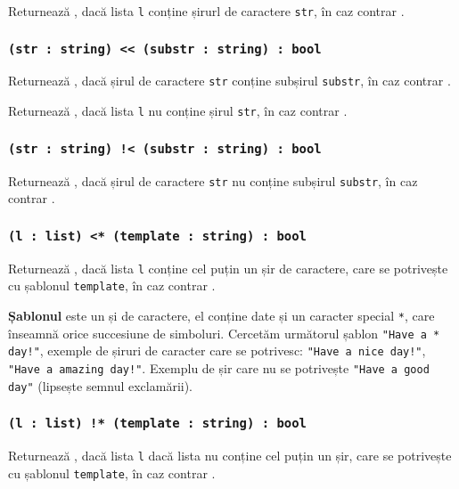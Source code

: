 Returnează \true{}, dacă lista \texttt{l} conține șirurl de caractere \texttt{str}, în caz contrar \false{}.

\subsubsection{\texttt{(str : string) << (substr : string) : bool}}

Returnează \true{}, dacă șirul de caractere \texttt{str} conține subșirul \texttt{substr}, în caz contrar \false{}.

Returnează \true{}, dacă lista \texttt{l} nu conține șirul \texttt{str}, în caz contrar \false{}.

\subsubsection{\texttt{(str : string) !< (substr : string) : bool}}

Returnează \true{}, dacă șirul de caractere \texttt{str} nu conține subșirul \texttt{substr}, în caz contrar \false{}.

\subsubsection{\texttt{(l : list) <* (template : string) : bool}}

Returnează \true{}, dacă lista \texttt{l} conține cel puțin un șir de caractere, care se potrivește cu șablonul \texttt{template}, în caz contrar \false{}.

{\bf Șablonul} este un și de caractere, el conține date și un caracter special \texttt{*}, care înseamnă orice succesiune de simboluri. Cercetăm următorul șablon \texttt{"Have a * day!"}, exemple de șiruri de caracter care se potrivesc: \texttt{"Have a nice day!"}, \texttt{"Have a amazing day!"}. Exemplu de șir care nu se potrivește \texttt{"Have a good day"} (lipsește semnul exclamării).

\subsubsection{\texttt{(l : list) !* (template : string) : bool}}

Returnează \true{}, dacă lista \texttt{l} dacă lista nu conține cel puțin un șir, care se potrivește cu șablonul \texttt{template}, în caz contrar \false{}.

